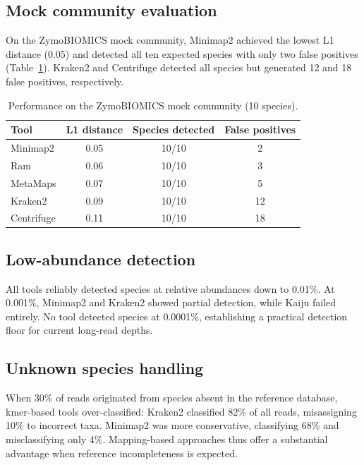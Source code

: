 \documentclass[12pt]{article}
\begin{document}
\subsection{Mock community evaluation}

On the ZymoBIOMICS mock community, Minimap2 achieved the lowest L1 distance (0.05) and detected all ten expected species with only two false positives (Table~\ref{tab:mock}). Kraken2 and Centrifuge detected all species but generated 12 and 18 false positives, respectively.

\begin{table}[ht]
\centering
\caption{Performance on the ZymoBIOMICS mock community (10 species).}
\label{tab:mock}
\begin{tabular}{lccc}
\toprule
Tool & L1 distance & Species detected & False positives \\
\midrule
Minimap2 & 0.05 & 10/10 & 2 \\
Ram & 0.06 & 10/10 & 3 \\
MetaMaps & 0.07 & 10/10 & 5 \\
Kraken2 & 0.09 & 10/10 & 12 \\
Centrifuge & 0.11 & 10/10 & 18 \\
\bottomrule
\end{tabular}
\end{table}

\subsection{Low-abundance detection}

All tools reliably detected species at relative abundances down to 0.01\%. At 0.001\%, Minimap2 and Kraken2 showed partial detection, while Kaiju failed entirely. No tool detected species at 0.0001\%, establishing a practical detection floor for current long-read depths.

\subsection{Unknown species handling}

When 30\% of reads originated from species absent in the reference database, kmer-based tools over-classified: Kraken2 classified 82\% of all reads, misassigning 10\% to incorrect taxa. Minimap2 was more conservative, classifying 68\% and misclassifying only 4\%. Mapping-based approaches thus offer a substantial advantage when reference incompleteness is expected.
\end{document}
